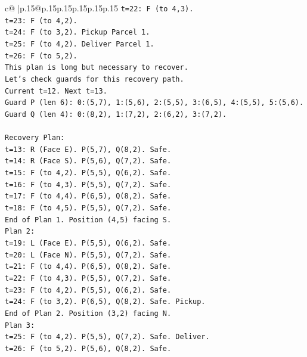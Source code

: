 \documentclass{article}
\begin{document}
{\begin{supertabular}{c@{$\;$}|p{.15\linewidth}@{}p{.15\linewidth}p{.15\linewidth}p{.15\linewidth}p{.15\linewidth}p{.15\linewidth}}
{{{\texttt{t=22: F (to 4,3).} \\
\texttt{t=23: F (to 4,2).} \\
\texttt{t=24: F (to 3,2). Pickup Parcel 1.} \\
\texttt{t=25: F (to 4,2). Deliver Parcel 1.} \\
\texttt{t=26: F (to 5,2).} \\
\texttt{This plan is long but necessary to recover.} \\
\texttt{Let's check guards for this recovery path.} \\
\texttt{Current t=12. Next t=13.} \\
\texttt{Guard P (len 6): 0:(5,7), 1:(5,6), 2:(5,5), 3:(6,5), 4:(5,5), 5:(5,6).} \\
\texttt{Guard Q (len 4): 0:(8,2), 1:(7,2), 2:(6,2), 3:(7,2).} \\
\\ 
\texttt{Recovery Plan:} \\
\texttt{t=13: R (Face E). P(5,7), Q(8,2). Safe.} \\
\texttt{t=14: R (Face S). P(5,6), Q(7,2). Safe.} \\
\texttt{t=15: F (to 4,2). P(5,5), Q(6,2). Safe.} \\
\texttt{t=16: F (to 4,3). P(5,5), Q(7,2). Safe.} \\
\texttt{t=17: F (to 4,4). P(6,5), Q(8,2). Safe.} \\
\texttt{t=18: F (to 4,5). P(5,5), Q(7,2). Safe.} \\
\texttt{End of Plan 1. Position (4,5) facing S.} \\
\texttt{Plan 2:} \\
\texttt{t=19: L (Face E). P(5,5), Q(6,2). Safe.} \\
\texttt{t=20: L (Face N). P(5,5), Q(7,2). Safe.} \\
\texttt{t=21: F (to 4,4). P(6,5), Q(8,2). Safe.} \\
\texttt{t=22: F (to 4,3). P(5,5), Q(7,2). Safe.} \\
\texttt{t=23: F (to 4,2). P(5,5), Q(6,2). Safe.} \\
\texttt{t=24: F (to 3,2). P(6,5), Q(8,2). Safe. Pickup.} \\
\texttt{End of Plan 2. Position (3,2) facing N.} \\
\texttt{Plan 3:} \\
\texttt{t=25: F (to 4,2). P(5,5), Q(7,2). Safe. Deliver.} \\
\texttt{t=26: F (to 5,2). P(5,6), Q(8,2). Safe.} \\
}}}
\end{supertabular}}
\end{document}
